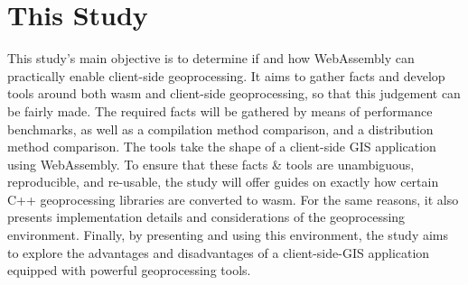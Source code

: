 % 
% 
% 
% 
% 
\newpage
\section{This Study}


This study's main objective is to determine if and how WebAssembly can practically enable client-side geoprocessing. It aims to gather facts and develop tools around both wasm and client-side geoprocessing, so that this judgement can be fairly made. 
The required facts will be gathered by means of performance benchmarks, as well as a compilation method comparison, and a distribution method comparison.  
The tools take the shape of a client-side GIS application using WebAssembly.
To ensure that these facts \& tools are unambiguous, reproducible, and re-usable, the study will offer guides on exactly how certain C++ geoprocessing libraries are converted to wasm. For the same reasons, it also presents implementation details and considerations of the geoprocessing environment.  
Finally, by presenting and using this environment, the study aims to explore the advantages and disadvantages of a client-side-GIS application equipped with powerful geoprocessing tools. 

